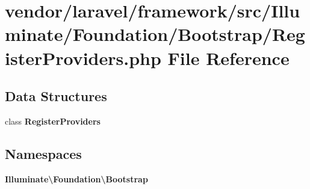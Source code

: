 \section{vendor/laravel/framework/src/\+Illuminate/\+Foundation/\+Bootstrap/\+Register\+Providers.php File Reference}
\label{_register_providers_8php}
\subsection*{Data Structures}
\begin{DoxyCompactItemize}
\item 
class {\bf Register\+Providers}
\end{DoxyCompactItemize}
\subsection*{Namespaces}
\begin{DoxyCompactItemize}
\item 
 {\bf Illuminate\textbackslash{}\+Foundation\textbackslash{}\+Bootstrap}
\end{DoxyCompactItemize}
